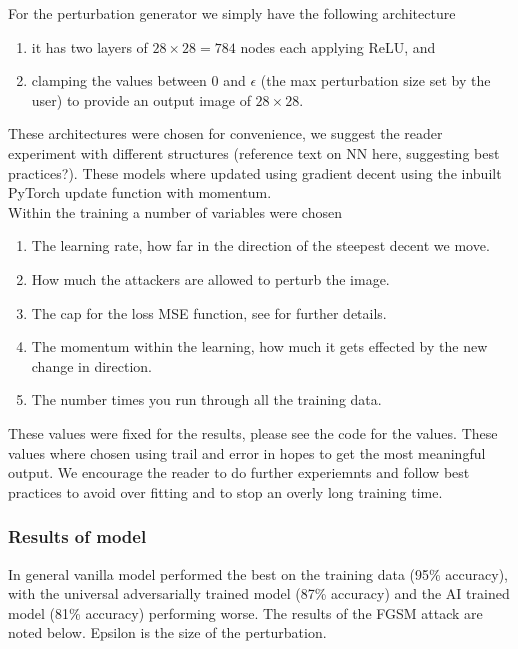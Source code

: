 For the perturbation generator we simply have the following architecture

\begin{enumerate}
	\item it has two layers of $28 \times 28 = 784$ nodes each applying ReLU, and
	\item clamping the values between 0 and $\epsilon$ (the max perturbation size set by the user) to provide an output image of $28 \times 28$.
\end{enumerate}

These architectures were chosen for convenience, we suggest the reader experiment with different structures (reference text on NN here, suggesting best practices?). These models where updated using gradient decent using the inbuilt PyTorch update function with momentum.\\

Within the training a number of variables were chosen

\begin{enumerate}
	\item The learning rate, how far in the direction of the steepest decent we move.
	\item How much the attackers are allowed to perturb the image.
	\item The cap for the loss MSE function, see \cite{shafahi_universal_2018} for further details.	
	\item The momentum within the learning, how much it gets effected by the new change in direction.
	\item The number times you run through all the training data.
\end{enumerate}

These values were fixed for the results, please see the code for the values. These values where chosen using trail and error in hopes to get the most meaningful output. We encourage the reader to do further experiemnts and follow best practices to avoid over fitting and to stop an overly long training time.

\subsubsection{Results of model}

In general vanilla model performed the best on the training data (95\% accuracy), with the universal adversarially trained model (87\% accuracy) and the AI trained model (81\% accuracy) performing worse. The results of the FGSM attack are noted below. Epsilon is the size of the perturbation.

